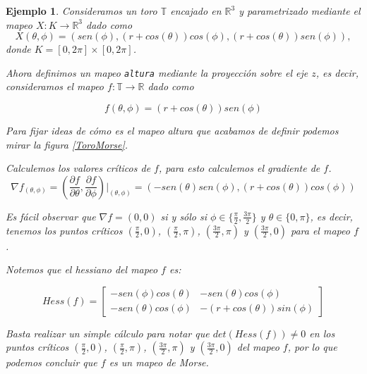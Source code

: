 \documentclass[a4paper,10pt]{book}
\newtheorem{eje}{Ejemplo}[chapter]
\begin{document}
\begin{eje}\label{EjeMor}
Consideramos un toro $\mathbb{T}$ encajado en $\mathbb{R}^{3}$ y parametrizado mediante el mapeo  $X:K\to\mathbb{R}^{3}$ dado como 
$$X(\theta, \phi)= \left( sen(\phi), (r+cos(\theta))cos(\phi), (r+cos(\theta))sen(\phi) \right),$$ 
donde $K = [0,2\pi]\times [0,2\pi]$.
\vspace{5mm}

Ahora definimos un mapeo \texttt{altura} mediante la proyecci\'on sobre el eje $z$, es decir, consideramos el mapeo 
$f:\mathbb{T}\to\mathbb{R}$ dado como 

\begin{equation}
f(\theta, \phi) = (r+cos(\theta))sen(\phi) 
\end{equation}

Para fijar ideas de c\'omo es el mapeo altura que acabamos de definir podemos mirar la figura \ref{ToroMorse}.
\vspace{5mm}
 
Calculemos los valores cr\'iticos de $f$, para esto calculemos el gradiente de $f$.
$$ \nabla f_{(\theta, \phi)} = \left( \frac{\partial f}{\partial\theta}, \frac{\partial f}{\partial\phi} \right)|_{(\theta,\phi)} = \left( -sen(\theta)sen(\phi), (r+cos(\theta))cos(\phi)\right)$$

Es f\'acil observar que $\nabla f= (0,0)$ si y s\'olo si $\phi\in\{\frac{\pi}{2},\frac{3\pi}{2}\}$ y $\theta\in\{0,\pi\}$, es decir, tenemos los puntos cr\'iticos $(\frac{\pi}{2},0)$, $(\frac{\pi}{2},\pi)$, $(\frac{3\pi}{2},\pi)$ y $(\frac{3\pi}{2},0)$ para el mapeo $f$.   
\vspace{5mm}

Notemos que el hessiano del mapeo  $f$ es:

\begin{equation*}
Hess(f)= \left[ 
\begin{array}{cc}
-sen(\phi)cos(\theta) & -sen(\theta)cos(\phi) \\
-sen(\theta)cos(\phi) &  -(r+cos(\theta))sin(\phi)
\end{array} \right]
\end{equation*}

Basta realizar un simple c\'alculo para notar que $det(Hess(f))\neq 0$ en los puntos cr\'iticos $(\frac{\pi}{2},0)$, $(\frac{\pi}{2},\pi)$, $(\frac{3\pi}{2},\pi)$ y $(\frac{3\pi}{2},0)$ del mapeo $f$, por lo que podemos concluir que $f$ es un mapeo de Morse.  


\end{eje}
\end{document}
